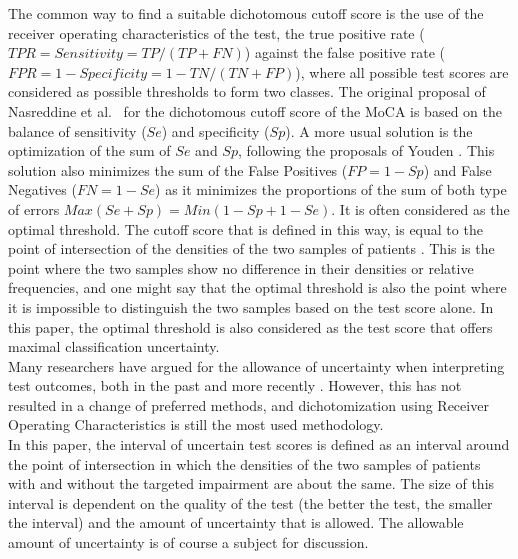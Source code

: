 \documentclass[
  nojss]{jss}
\begin{document}
The common way to find a suitable dichotomous cutoff score is the use of
the receiver operating characteristics of the test, the true positive
rate (\(TPR = Sensitivity = TP / (TP + FN)\)) against the false positive
rate (\(FPR = 1 - Specificity = 1 - TN / (TN + FP)\)), where all
possible test scores are considered as possible thresholds to form two
classes. The original proposal of Nasreddine et
al.~\citeyearpar{nasreddine_montreal_2005} for the dichotomous cutoff
score of the MoCA is based on the balance of sensitivity (\(Se\)) and
specificity (\(Sp\)). A more usual solution is the optimization of the
sum of \(Se\) and \(Sp\), following the proposals of Youden
\citep{youden_index_1950}. This solution also minimizes the sum of the
False Positives (\(FP = 1 - Sp\)) and False Negatives (\(FN = 1 - Se\))
as it minimizes the proportions of the sum of both type of errors
\(Max(Se + Sp) = Min(1 - Sp + 1 - Se)\). It is often considered as the
optimal threshold. The cutoff score that is defined in this way, is
equal to the point of intersection of the densities of the two samples
of patients \citep{schisterman_optimal_2005}. This is the point where
the two samples show no difference in their densities or relative
frequencies, and one might say that the optimal threshold is also the
point where it is impossible to distinguish the two samples based on the
test score alone. In this paper, the optimal threshold is also
considered as the test score that offers maximal classification
uncertainty.\\
Many researchers have argued for the allowance of uncertainty when
interpreting test outcomes, both in the past
\citep{coste_gray_2006, coste_grey_2003, feinstein_inadequacy_1990, greiner_two-graph_1995, simel_intermediate_1987}
and more recently
\citep{hofmann_back_2019, landsheer_interval_2016, landsheer_clinical_2018, schuetz_use_2012, shinkins_diagnostic_2013}.
However, this has not resulted in a change of preferred methods, and
dichotomization using Receiver Operating Characteristics is still the
most used methodology.\\
In this paper, the interval of uncertain test scores is defined as an
interval around the point of intersection in which the densities of the
two samples of patients with and without the targeted impairment are
about the same. The size of this interval is dependent on the quality of
the test (the better the test, the smaller the interval) and the amount
of uncertainty that is allowed. The allowable amount of uncertainty is
of course a subject for discussion.
\end{document}
